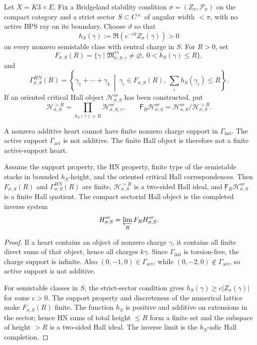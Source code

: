 \documentclass[11pt]{memoir}
\begin{document}
\begin{definition}
Let \(X=K3\times E\).  Fix a Bridgeland stability condition
\(\sigma=(Z_\sigma,\mathcal P_\sigma)\) on the compact category and a
strict sector \(S\subset\C^\times\) of angular width \(<\pi\), with no
active BPS ray on its boundary.  Choose \(\vartheta\) so that
$$
h_S(\gamma):=\Re(e^{-i\vartheta}Z_\sigma(\gamma))>0
$$
on every nonzero semistable class with central charge in \(S\).
For \(R>0\), set
$$
F_{\sigma,S}(R)
=\{\gamma\mid \mathfrak M_{\sigma,S,\gamma}^{ss}\ne\varnothing,\
0<h_S(\gamma)\le R\},
$$
and
$$
\Gamma_{\sigma,S}^{HN}(R)
=\left\{\gamma_1+\cdots+\gamma_k\ \middle|\
\gamma_i\in F_{\sigma,S}(R),\
\sum_i h_S(\gamma_i)\le R\right\}.
$$
If an oriented critical Hall object
\(\mathcal H_{\sigma,S}^{or}\) has been constructed, put
$$
\mathcal H_{\sigma,S}^{>R}
=\prod_{h_S(\gamma)>R}\mathcal H_{\sigma,S,\gamma}^{or},
\qquad
\mathsf F_R\mathcal H_{\sigma,S}^{or}
=\mathcal H_{\sigma,S}^{or}/\mathcal H_{\sigma,S}^{>R}.
$$
\end{definition}

\begin{proposition}
\label{prop:sectorial-hall-truncation}
A nonzero additive heart cannot have finite nonzero charge support in
\(\Gamma_{\mathrm{ind}}\).  The active support
\(\Gamma_{\mathrm{act}}\) is not additive.  The finite Hall object is
therefore not a finite active-support heart.

Assume the support property, the HN property, finite type of the
semistable stacks in bounded \(h_S\)-height, and the oriented critical
Hall correspondences.  Then \(F_{\sigma,S}(R)\) and
\(\Gamma_{\sigma,S}^{HN}(R)\) are finite,
\(\mathcal H_{\sigma,S}^{>R}\) is a two-sided Hall ideal, and
\(\mathsf F_R\mathcal H_{\sigma,S}^{or}\) is a finite Hall quotient.
The compact sectorial Hall object is the completed inverse system
$$
\widehat{\mathcal H}_{\sigma,S}^{or}
=\varprojlim_R\mathsf F_R\mathcal H_{\sigma,S}^{or}.
$$
\end{proposition}

\begin{proof}
If a heart contains an object of nonzero charge \(\gamma\), it contains
all finite direct sums of that object, hence all charges \(k\gamma\).
Since \(\Gamma_{\mathrm{ind}}\) is torsion-free, the charge support is
infinite.  Also \((0,-1,0)\in\Gamma_{\mathrm{act}}\), while
\((0,-2,0)\notin\Gamma_{\mathrm{act}}\), so active support is not
additive.

For semistable classes in \(S\), the strict-sector condition gives
\(h_S(\gamma)\ge c|Z_\sigma(\gamma)|\) for some \(c>0\).  The support
property and discreteness of the numerical lattice make
\(F_{\sigma,S}(R)\) finite.  The function \(h_S\) is positive and
additive on extensions in the sector; hence HN sums of total height
\(\le R\) form a finite set and the subspace of height \(>R\) is a
two-sided Hall ideal.  The inverse limit is the \(h_S\)-adic Hall
completion.
\end{proof}
\end{document}
